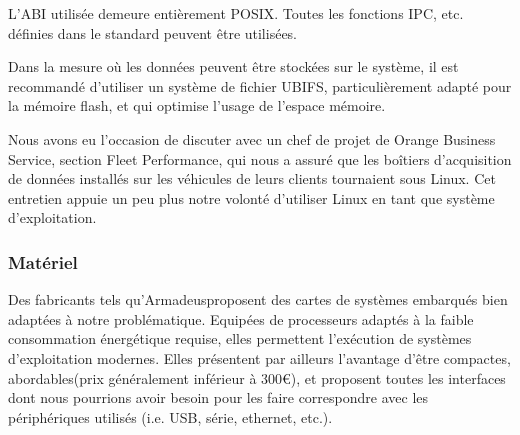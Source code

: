 L'ABI utilisée demeure entièrement POSIX\footnotemark. Toutes les fonctions IPC, etc. définies dans le standard peuvent être utilisées\footnotemark.



Dans la mesure où les données peuvent être stockées sur le système, il est recommandé d'utiliser un système de fichier UBIFS\footnotemark, particulièrement adapté pour la mémoire flash, et qui optimise l'usage de l'espace mémoire.


Nous avons eu l'occasion de discuter avec un chef de projet de Orange Business Service, section Fleet Performance, qui nous a assuré que les boîtiers d'acquisition de données installés sur les véhicules de leurs clients tournaient sous Linux. Cet entretien appuie un peu plus notre volonté d'utiliser Linux en tant que système d'exploitation.

\subsubsection{Matériel}

Des fabricants tels qu'Armadeus\footnotemark proposent des cartes de systèmes embarqués bien adaptées à notre problématique. Equipées de processeurs adaptés à la faible consommation énergétique requise, elles permettent l'exécution de systèmes d'exploitation modernes. Elles présentent par ailleurs l'avantage d'être compactes, abordables\footnotemark (prix généralement inférieur à 300\euro ), et proposent toutes les interfaces dont nous pourrions avoir besoin pour les faire correspondre avec les périphériques utilisés (i.e. USB, série, ethernet, etc.).



